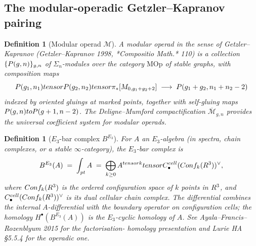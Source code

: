 \documentclass[11pt]{article}
\newtheorem{definition}[theorem]{Definition}
\providecommand{\cM}{\mathcal{M}}
\providecommand{\Conf}{\mathrm{Conf}}
\providecommand{\Mbar}{\overline{\mathcal M}}
\begin{document}
\subsection{The modular-operadic Getzler--Kapranov pairing}
\label{subsec:bl1-gk-pairing}

\begin{definition}[Modular operad $\cM$]
\label{def:bl1-modular-operad}
A \emph{modular operad} in the sense of Getzler--Kapranov
(Getzler--Kapranov 1998, *Compositio Math.* 110) is a collection
$\{P(g, n)\}_{g, n}$ of $\Sigma_n$-modules over the category
$\mathrm{MOp}$ of stable graphs, with composition maps
\begin{equation}
  \cP(g_1, n_1) \otimes \cP(g_2, n_2) \otimes \pi_*[\Mbar_{0, g_1+g_2+2}]
  \;\longrightarrow\; \cP(g_1 + g_2, n_1 + n_2 - 2)
\end{equation}
indexed by oriented gluings at marked points, together with self-gluing
maps
$P(g, n) to P(g+1, n-2)$. The Deligne--Mumford compactification
$\Mbar_{g, n}$ provides the universal coefficient system for modular
operads.
\end{definition}

\begin{definition}[$E_3$-bar complex $B^{E_3}$]
\label{def:bl1-e3-bar}
For $A$ an $E_3$-algebra (in spectra, chain complexes, or a stable
$\infty$-category), the $E_3$-bar complex is
\begin{equation}
  B^{E_3}(A)
  \;=\;
  \int_{\mathrm{pt}} A \;=\; \bigoplus_{k \geq 0}
  A^{\otimes k} \otimes C_\bullet^{\mathrm{cell}}(\Conf_k(\R^3))^\vee,
\end{equation}
where $\Conf_k(\R^3)$ is the ordered configuration space of $k$ points
in $R^3$, and $C_\bullet^{\mathrm{cell}}(\Conf_k(\R^3))^\vee$ is its
dual cellular chain complex. The differential combines the internal
$A$-differential with the boundary operator on configuration cells;
the homology $H^\bullet(B^{E_3}(A))$ is the $E_3$-cyclic homology of
$A$. See Ayala--Francis--Rozenblyum 2015 for the factorisation-
homology presentation and Lurie HA \S 5.5.4 for the operadic one.
\end{definition}
\end{document}
